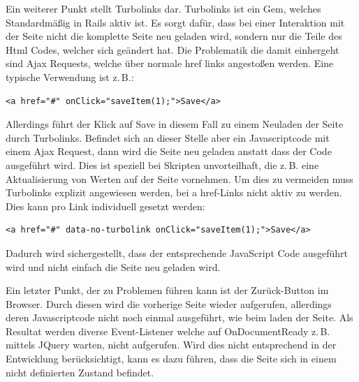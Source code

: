 Ein weiterer Punkt stellt Turbolinks dar. Turbolinks ist ein Gem, welches Standardmäßig in Rails aktiv ist. Es sorgt dafür, dass bei einer Interaktion mit der Seite nicht die komplette Seite neu geladen wird, sondern nur die Teile des Html Codes, welcher sich geändert hat.\cite{Gamble.2013} Die Problematik die damit einhergeht sind Ajax Requests, welche über normale href links angestoßen werden. Eine typische Verwendung ist z.\,B.:
\\
\lstset{
   language=Html
}

\begin{lstlisting}[caption=a href HTML Code, label=code:ch5:html01]
<a href="#" onClick="saveItem(1);">Save</a>
\end{lstlisting}

Allerdings führt der Klick auf \glqq Save\grqq{} in diesem Fall zu einem Neuladen der Seite durch Turbolinks. Befindet sich an dieser Stelle aber ein Javascriptcode mit einem Ajax Request, dann wird die Seite neu geladen anstatt dass der Code ausgeführt wird. Dies ist speziell bei Skripten unvorteilhaft, die z.\,B. eine Aktualisierung von Werten auf der Seite vornehmen.
Um dies zu vermeiden muss Turbolinks explizit angewiesen werden, bei \glqq a href\grqq{}-Links nicht aktiv zu werden. Dies kann pro Link individuell gesetzt werden:
\\
\begin{lstlisting}[caption=a href HTML Code - Turbolinks deaktiviert, label=code:ch5:html01]
<a href="#" data-no-turbolink onClick="saveItem(1);">Save</a>
\end{lstlisting}

Dadurch wird sichergestellt, dass der entsprechende JavaScript Code ausgeführt wird und nicht einfach die Seite neu geladen wird.

Ein letzter Punkt, der zu Problemen führen kann ist der \glqq Zurück\grqq{}-Button im Browser.
Durch diesen wird die vorherige Seite wieder aufgerufen, allerdings deren Javascriptcode nicht noch einmal ausgeführt, wie beim laden der Seite. Als Resultat werden diverse Event-Listener welche auf \glqq OnDocumentReady\grqq{} z.\,B. mittels JQuery warten, nicht aufgerufen. Wird dies nicht entsprechend in der Entwicklung berücksichtigt, kann es dazu führen, dass die Seite sich in einem nicht definierten Zustand befindet.
